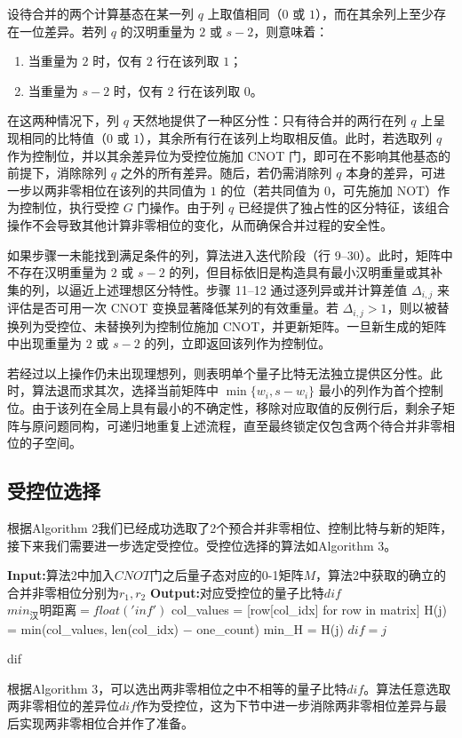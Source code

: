 \documentclass[10.5pt,compsoc,UTF8]{CjC}
\theoremstyle{mystyle}
\begin{document}
设待合并的两个计算基态在某一列 $q$ 上取值相同（$0$ 或 $1$），而在其余列上至少存在一位差异。若列 $q$ 的汉明重量为 $2$ 或 $s-2$，则意味着：
\begin{enumerate}
    \item 当重量为 $2$ 时，仅有 $2$ 行在该列取 $1$；
    \item 当重量为 $s-2$ 时，仅有 $2$ 行在该列取 $0$。
\end{enumerate}
在这两种情况下，列 $q$ 天然地提供了一种区分性：只有待合并的两行在列 $q$ 上呈现相同的比特值（$0$ 或 $1$），其余所有行在该列上均取相反值。此时，若选取列 $q$ 作为控制位，并以其余差异位为受控位施加 CNOT 门，即可在不影响其他基态的前提下，消除除列 $q$ 之外的所有差异。随后，若仍需消除列 $q$ 本身的差异，可进一步以两非零相位在该列的共同值为 $1$ 的位（若共同值为 $0$，可先施加 NOT）作为控制位，执行受控 $G$ 门操作。由于列 $q$ 已经提供了独占性的区分特征，该组合操作不会导致其他计算非零相位的变化，从而确保合并过程的安全性。

如果步骤一未能找到满足条件的列，算法进入迭代阶段（行 9--30）。此时，矩阵中不存在汉明重量为 $2$ 或 $s-2$ 的列，但目标依旧是构造具有最小汉明重量或其补集的列，以逼近上述理想区分特性。步骤 11--12 通过逐列异或并计算差值 $\Delta_{i,j}$ 来评估是否可用一次 CNOT 变换显著降低某列的有效重量。若 $\Delta_{i,j}>1$，则以被替换列为受控位、未替换列为控制位施加 CNOT，并更新矩阵。一旦新生成的矩阵中出现重量为 $2$ 或 $s-2$ 的列，立即返回该列作为控制位。

若经过以上操作仍未出现理想列，则表明单个量子比特无法独立提供区分性。此时，算法退而求其次，选择当前矩阵中 $\min\{w_i, s-w_i\}$ 最小的列作为首个控制位。由于该列在全局上具有最小的不确定性，移除对应取值的反例行后，剩余子矩阵与原问题同构，可递归地重复上述流程，直至最终锁定仅包含两个待合并非零相位的子空间。

\subsection{受控位选择}
根据Algorithm 2我们已经成功选取了2个预合并非零相位、控制比特与新的矩阵，接下来我们需要进一步选定受控位。受控位选择的算法如Algorithm 3。
\begin{algorithm}[H]
\caption{选择多控G门差异位算法}
\begin{algorithmic}[1]
\State \textbf{Input:}算法2中加入$CNOT$门之后量子态对应的0-1矩阵$M$，算法2中获取的确立的合并非零相位分别为$r_1,r_2$
\State \textbf{Output:}对应受控位的量子比特$dif$
\State $min_汉明距离 = float('inf')$
\State col\_values = [row[col\_idx] for row in matrix]
\State H(j) = min(col\_values, len(col\_idx) $-$ one\_count)
\State min\_H = H(j)
\State $dif = j$
\EndIf
\EndIf
\EndFor

\Return dif

\end{algorithmic}
\end{algorithm}
根据Algorithm 3，可以选出两非零相位之中不相等的量子比特$dif$。算法任意选取两非零相位的差异位$dif$作为受控位，这为下节中进一步消除两非零相位差异与最后实现两非零相位合并作了准备。
\end{document}
